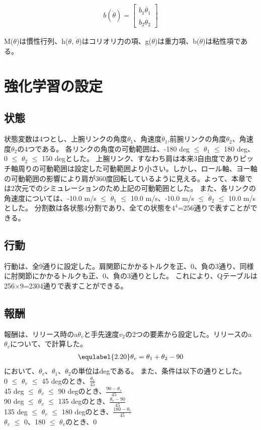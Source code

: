 \begin{eqnarray}
  b(\dot{\theta})=
            \begin{bmatrix}
              b_{1}\dot{\theta_{1}} \\
              b_{2}\dot{\theta_{2}}
            \end{bmatrix}
\end{eqnarray}

M($\theta$)は慣性行列、h($\theta$, $\dot{\theta}$)はコリオリ力の項、g($\theta$)は重力項、b($\dot{\theta}$)は粘性項である。

\section{強化学習の設定}
\subsection{状態}
状態変数は4つとし、上腕リンクの角度$\theta_{1}$、角速度$\dot{\theta}_{1}$,前腕リンクの角度$\theta_{2}$、角速度$\dot{\theta}_{2}$の4つである。
各リンクの角度の可動範囲は、-180 deg $\le$ $\theta_{1}$ $\le$ 180 deg、0 $\le$ $\theta_{2}$ $\le$ 150 degとした。
上腕リンク、すなわち肩は本来3自由度でありピッチ軸周りの可動範囲は設定した可動範囲より小さい。しかし、ロール軸、ヨー軸の可動範囲の影響により肩が360度回転しているように見える。よって、本章では2次元でのシミュレーションのため上記の可動範囲とした。
また、各リンクの角速度については、-10.0 m/s $\le$ $\dot{\theta}_{1}$ $\le$ 10.0 m/s、-10.0 m/s $\le$ $\dot{\theta}_{2}$ $\le$ 10.0 m/sとした。
分割数は各状態4分割であり、全ての状態を$4^{4}$=256通りで表すことができる。
\subsection{行動}
行動は、全9通りに設定した。肩関節にかかるトルクを正、0、負の3通り、同様に肘関節にかかるトルクも正、0、負の3通りとした。
これにより、Qテーブルは256$\times$9=2304通りで表すことができる。
\subsection{報酬}
報酬は、リリース時のa$\theta_{v}$と手先速度$v_{2}$の2つの要素から設定した。リリースのa$\theta_{v}$について、で計算した。
\begin{eqnarray}
  \equlabel{2.20}
  \theta_{v}=\theta_{1}+\theta_{2}-90
\end{eqnarray}
において、$\theta_{v}$、$\theta_{1}$、$\theta_{2}$の単位はdegである。
また、条件は以下の通りとした。\\
0 $\le$ $\theta_{v}$ $\le$ 45 degのとき、$\frac{\theta_{v}}{45}$\\
45 deg $\le$ $\theta_{v}$ $\le$ 90 degのとき、$\frac{90-\theta_{v}}{45}$\\
90 deg $\le$ $\theta_{v}$ $\le$ 135 degのとき、$\frac{\theta_{v}-90}{45}$\\
135 deg $\le$ $\theta_{v}$ $\le$ 180 degのとき、$\frac{180-\theta_{v}}{45}$\\
$\theta_{v}$ $\le$ 0、180 $\le$ $\theta_{v}$のとき、0\\

